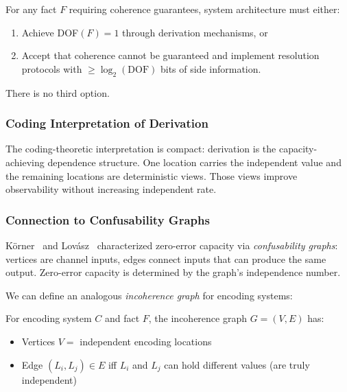 \begin{corollary}\label{cor:architectural-forcing}
For any fact $F$ requiring coherence guarantees, system architecture must either:
\begin{enumerate}
\tightlist
\item Achieve DOF$(F) = 1$ through derivation mechanisms, or
\item Accept that coherence cannot be guaranteed and implement resolution protocols with $\geq \log_2(\text{DOF})$ bits of side information.
\end{enumerate}
There is no third option.
\end{corollary}

\subsubsection{Coding Interpretation of Derivation}

The coding-theoretic interpretation is compact: derivation is the capacity-achieving dependence structure. One location carries the independent value and the remaining locations are deterministic views. Those views improve observability without increasing independent rate.

\subsubsection{Connection to Confusability Graphs}

Körner~\cite{korner1973graphs} and Lovász~\cite{lovasz1979shannon} characterized zero-error capacity via \emph{confusability graphs}: vertices are channel inputs, edges connect inputs that can produce the same output. Zero-error capacity is determined by the graph's independence number.

We can define an analogous \emph{incoherence graph} for encoding systems:

\begin{definition}\label{def:incoherence-graph}
For encoding system $C$ and fact $F$, the incoherence graph $G = (V, E)$ has:
\begin{itemize}
\tightlist
\item Vertices $V = $ independent encoding locations
\item Edge $(L_i, L_j) \in E$ iff $L_i$ and $L_j$ can hold different values (are truly independent)
\end{itemize}
\end{definition}

